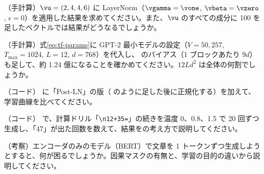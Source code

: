 \begin{exercises}
\item （手計算）$\vu=(2,4,4,6)$ に LayerNorm（$\vgamma=\vone$, $\vbeta=\vzero$, $\epsilon=0$）を適用した結果を求めてください。また、$\vu$ のすべての成分に 100 を足したベクトルでは結果がどうなるでしょうか。
\item （手計算）式\eqref{eq:tf-params}に GPT-2 最小モデルの設定（$V=50{,}257$, $T_{\max}=1024$, $L=12$, $d=768$）を代入し、 のバイアス（1 ブロックあたり $9d$）も足して、約 1.24 億になることを確かめてください。$12Ld^2$ は全体の何割でしょうか。
\item （コード） に「Post-LN」の版（ のように足した後に正規化する）を加えて、学習曲線を比べてください。
\item （コード） で、計算ドリル「\texttt{\textbackslash n12+35=}」の続きを温度 0、0.8、1.5 で 20 回ずつ生成し、「47」が出た回数を数えて、結果をの考え方で説明してください。
\item （考察）エンコーダのみのモデル（BERT）で文章を 1 トークンずつ生成しようとすると、何が困るでしょうか。因果マスクの有無と、学習の目的の違いから説明してください。
\end{exercises}
